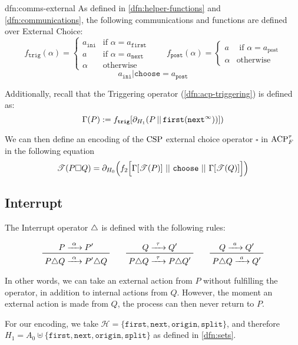 \documentclass[../hons_project.tex]{subfiles}
\begin{document}
\begin{dfn}{dfn:comms-external}{}
	As defined in \ref{dfn:helper-functions} and \ref{dfn:communications}, the following communications and functions are defined over External Choice:
	\[f_{\mathtt{trig}}(\alpha) = \begin{cases}
			a_{\mathtt{ini}} & \text{if } \alpha = a_{\mathtt{first}} \\
			a                & \text{if } \alpha = a_{\mathtt{next}}  \\
			\alpha           & \text{otherwise}
		\end{cases} \qquad f_{\mathtt{post}}(\alpha) = \begin{cases}
			a      & \text{ if } \alpha = a_{\mathrm{post}} \\
			\alpha & \text{otherwise}
		\end{cases}
	\]
	\[
		a_{\mathtt{ini}} | \mathtt{choose} = a_{\mathtt{post}}
	\]
	\longrule{0.08ex}

	Additionally, recall that the Triggering operator (\ref{dfn:acp-triggering}) is defined as:
	\[\Gamma(P) := f_{\mathtt{trig}}[\partial_{H_{1}}(P \merge \mathtt{first}(\mathtt{next}^{\infty}))])\]
\end{dfn}


We can then define an encoding of the $\csp$ external choice operator $\square$ in $\acptf$ in the following equation
\[\trans{P \square Q} = \partial_{H_{0}}\Bigl(f_{2}\Bigl[\Gamma[\trans{P}]\, \merge \,\mathtt{choose}\, \merge \,\Gamma[\trans{Q}]\Bigl]\Bigr)\]

\subsection{Interrupt}\label{ssec:interrupt}

The Interrupt operator $\interrupt$ is defined with the following rules:

\[\prftree{P \prightarrow{\alpha} P'}{P \interrupt Q \prightarrow{\alpha} P' \interrupt Q} \qquad \prftree{Q \prightarrow{\tau} Q'}{P \interrupt Q \prightarrow{\tau} P \interrupt Q'} \qquad \prftree{Q \prightarrow{a} Q'}{P \interrupt Q \prightarrow{a} Q'}\]

In other words, we can take an external action from $P$ without fulfilling the operator, in addition to internal actions from $Q$. However, the moment an external action is made from $Q$, the process can then never return to $P$.

For our encoding, we take $\mathscr{H} = \{\mathtt{first}, \mathtt{next}, \mathtt{origin}, \mathtt{split}\}$, and therefore $H_{1} = A_{0} \uplus \{\mathtt{first}, \mathtt{next}, \mathtt{origin}, \mathtt{split}\}$ as defined in \ref{dfn:sets}.
\end{document}
